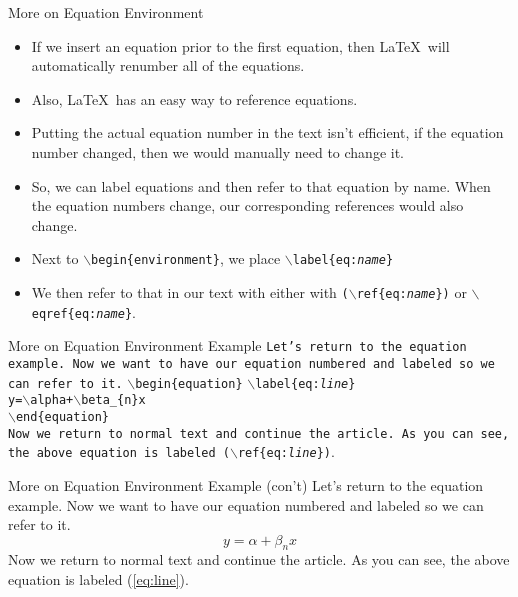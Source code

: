 \documentclass[pdf]{prosper}
\begin{document}
\begin{slide}{More on Equation Environment}
	\begin{itemize}
		\item If we insert an equation prior to the first equation, then \LaTeX\ will automatically renumber all of the equations.
		\item Also, \LaTeX\ has an easy way to reference equations.
		\item Putting the actual equation number in the text isn't efficient, if the equation number changed, then we would manually need to change it.
		\item So, we can label equations and then refer to that equation by name. When the equation numbers change, our corresponding references would also change.
		\item Next to \texttt{$\backslash$begin\{environment\}}, we place \texttt{$\backslash$label\{eq:\textit{name}\}}
		\item We then refer to that in our text with either with \texttt{($\backslash$ref\{eq:\textit{name}\})} or \texttt{$\backslash$eqref\{eq:\textit{name}\}}.
	\end{itemize}
\end{slide}
\begin{slide}{More on Equation Environment Example}
	\texttt{Let's return to the equation example. Now we want to have our equation numbered and labeled so we can refer to it.}
	\texttt{$\backslash$begin\{equation\}} \texttt{$\backslash$label\{eq:\textit{line}\}} \\
	\texttt{y=$\backslash$alpha+$\backslash$beta\_\{n\}x} \\
	\texttt{$\backslash$end\{equation\}} \\
	\texttt{Now we return to normal text and continue the article. As you can see, the above equation is labeled \texttt{($\backslash$ref\{eq:\textit{line}\})}}.
\end{slide}
\begin{slide}{More on Equation Environment Example (con't)}
	Let's return to the equation example. Now we want to have our equation numbered and labeled so we can refer to it.
	\begin{equation} \label{eq:line}
	y=\alpha+\beta_{n}x
	\end{equation}
	Now we return to normal text and continue the article. As you can see, the above equation is labeled (\ref{eq:line}).
\end{slide}
\end{document}
